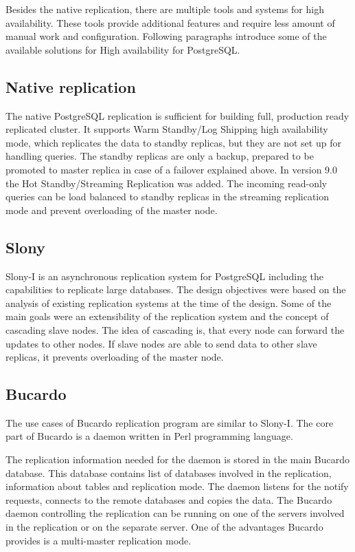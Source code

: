 \documentclass[
  digital, %
  twoside, %
  table,   %
  lof,     %
  lot,     %
]{fithesis3}
\begin{document}
Besides the native replication, there are multiple tools and systems for high availability. These tools provide additional features and require less amount of manual work and configuration. Following paragraphs introduce some of the available solutions for High availability for PostgreSQL.

\subsection{Native replication}
The native PostgreSQL replication is sufficient for building full, production ready replicated cluster. It supports Warm Standby/Log Shipping high availability mode, which replicates the data to standby replicas, but they are not set up for handling queries. The standby replicas are only a backup, prepared to be promoted to master replica in case of a failover explained above. In version 9.0 the Hot Standby/Streaming Replication was added. The incoming read-only queries can be load balanced to standby replicas in the streaming replication mode and prevent overloading of the master node.

\subsection{Slony}
Slony-I \cite{slony} is an asynchronous replication system for PostgreSQL including the capabilities to replicate large databases. The design objectives were based on the analysis of existing replication systems at the time of the design. Some of the main goals were an extensibility of the replication system and the concept of cascading slave nodes. The idea of cascading is, that every node can forward the updates to other nodes. If slave nodes are able to send data to other slave replicas, it prevents overloading of the master node.

\subsection{Bucardo}
The use cases of Bucardo \cite{bucardo} replication program are similar to Slony-I. The core part of Bucardo is a daemon written in Perl \cite{perl} programming language.

The replication information needed for the daemon is stored in the main Bucardo database. This database contains list of databases involved in the replication, information about tables and replication mode. The daemon listens for the notify requests, connects to the remote databases and copies the data. The Bucardo daemon controlling the replication can be running on one of the servers involved in the replication or on the separate server. One of the advantages Bucardo provides is a multi-master replication mode.
\end{document}
